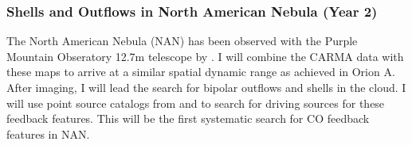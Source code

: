 \subsubsection{Shells and Outflows in North American Nebula (Year 2)}\label{sec:paper3}
        The North American Nebula (NAN) has been observed with the Purple Mountain Obseratory 12.7m telescope by \citet{Zhang14}. I will combine the CARMA data with these maps to arrive at a similar spatial dynamic range as achieved in Orion A. After imaging, I will lead the search for bipolar outflows and shells in the cloud. I will use point source catalogs from \citet{Rebull_2011} and \citet{Zhang14} to search for driving sources for these feedback features. This will be the first systematic search for CO feedback features in NAN. 


    